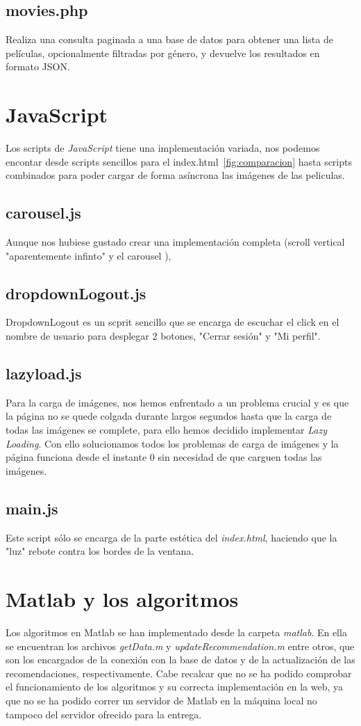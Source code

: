 \documentclass[a4paper, 12pt]{report}
\begin{document}
    \section{movies.php}
    Realiza una consulta paginada a una base de datos para obtener una lista de películas, opcionalmente filtradas por género, y devuelve los resultados en formato JSON.

    \chapter{JavaScript}

    Los scripts de \textit{JavaScript} tiene una implementación variada, nos podemos encontar desde scripts sencillos para el index.html~\ref{fig:comparacion} hasta scripts combinados para poder cargar de forma asíncrona las imágenes de las peliculas.
 
    \section{carousel.js}
    Aunque nos hubiese gustado crear una implementación completa (scroll vertical "aparentemente infinto" y el carousel \cite{carousel}),
    \section{dropdownLogout.js}
    DropdownLogout es un scprit sencillo que se encarga de escuchar el click en el nombre de usuario para desplegar 2 botones, "Cerrar sesión" y "Mi perfil".
    \section{lazyload.js}
    Para la carga de imágenes, nos hemos enfrentado a un problema crucial y es que la página no se quede colgada durante largos segundos hasta que la carga de todas las imágenes se complete, para ello hemos decidido implementar \textit{Lazy Loading}\cite{lazyloading}. Con ello solucionamos todos los problemas de carga de imágenes y la página funciona desde el instante 0 sin necesidad de que carguen todas las imágenes.
    \section{main.js}
    Este script sólo se encarga de la parte estética del \textit{index.html}, haciendo que la "luz" rebote contra los bordes de la ventana.

    \chapter{Matlab y los algoritmos}
    Los algoritmos en Matlab se han implementado desde la carpeta \textit{matlab}. En ella se encuentran los archivos \textit{getData.m} y \textit{updateRecommendation.m} entre otros, que son los encargados de la conexión con la base de datos y de la actualización de las recomendaciones, respectivamente.
    Cabe recalcar que no se ha podido comprobar el funcionamiento de los algoritmos y su correcta implementación en la web, ya que no se ha podido correr un servidor de Matlab en la máquina local no tampoco del servidor ofrecido para la entrega.
\end{document}
